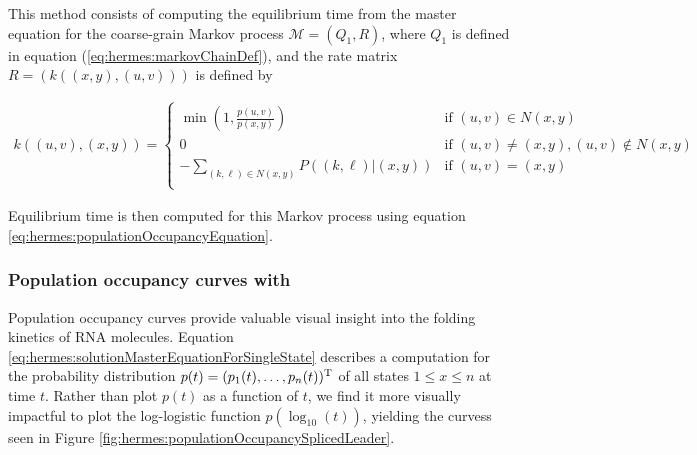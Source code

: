 This method consists of computing the equilibrium time
from the master equation for the coarse-grain Markov process
$\mathcal{M}=(Q_1,R)$, where $Q_1$ is defined in equation
(\ref{eq:hermes:markovChainDef}), and the rate matrix
$R = (k((x,y),(u,v)))$ is defined by

\begin{align}
\label{eq:hermes:xitionRateFfttwoWithoutHastings}
k((u,v),(x,y))=
\begin{cases}
\min\left(1, \frac{p(u,v)}{p(x,y)}\right) & \text{if $(u,v) \in N(x,y)$} \\
0 &\text{if $(u,v) \ne (x,y), (u,v) \not\in N(x,y)$} \\
- \sum_{(k,\ell) \in N(x,y)} P((k,\ell)|(x,y)) & \text{if $(u,v)=(x,y)$} \\
\end{cases}
\end{align}

Equilibrium time is then computed for this Markov process using equation
\ref{eq:hermes:populationOccupancyEquation}.

\subsubsection{Population occupancy curves with \ffteq}
\label{subsubsec:hermes:popcurve}

Population occupancy curves provide valuable visual insight into the folding
kinetics of RNA molecules.
Equation \ref{eq:hermes:solutionMasterEquationForSingleState} describes a
computation for the probability distribution
$p(t)=(p_1(t),\dots,p_n(t))^{\text T}$ of all states $1 \leq x \leq n$ at
time $t$. Rather than plot $p(t)$ as a function of $t$, we find it more
visually impactful to plot the log-logistic function $p(\log_{10}(t))$,
yielding the curvess seen in Figure \ref{fig:hermes:populationOccupancySplicedLeader}.

